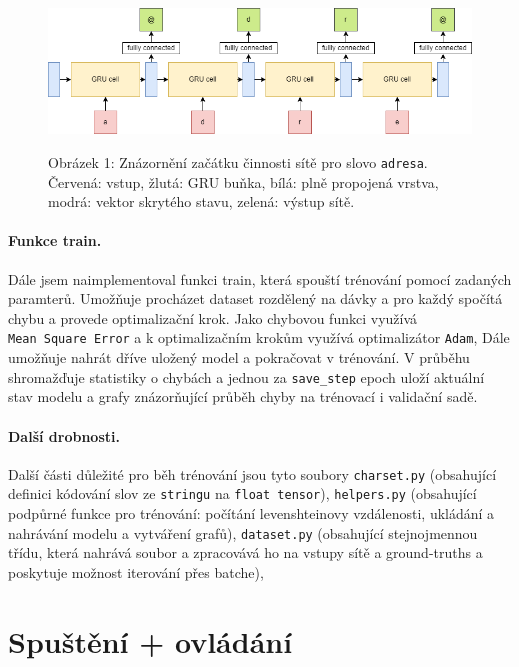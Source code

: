 \documentclass[a4paper]{article}
\theoremstyle{definition}
\begin{document}
\begin{figure}[t!]
  \centering
  \includegraphics[width=4.5in]{gru_diagram_adresa.png}\\[1pt]  %
  \caption{Obrázek 1: Znázornění začátku činnosti sítě pro slovo \texttt{adresa}.\\Červená: vstup, žlutá: GRU buňka, bílá: plně propojená vrstva, modrá: vektor skrytého stavu, zelená: výstup sítě.}
  \label{png:gru_adresa}
\end{figure}

\paragraph{Funkce train.}
Dále jsem naimplementoval funkci train, která spouští trénování pomocí zadaných paramterů. Umožňuje procházet dataset rozdělený na dávky a pro každý spočítá chybu a provede optimalizační krok. Jako chybovou funkci využívá \texttt{Mean\ Square\ Error} a k optimalizačním krokům využívá optimalizátor \texttt{Adam}, Dále umožňuje nahrát dříve uložený model a pokračovat v trénování. V průběhu shromažďuje statistiky o chybách a jednou za \texttt{save\_step} epoch uloží aktuální stav modelu a grafy znázorňující průběh chyby na trénovací i validační sadě.

\paragraph{Další drobnosti.}
Další části důležité pro běh trénování jsou tyto soubory \texttt{charset.py} (obsahující definici kódování slov ze \texttt{stringu} na \texttt{float tensor}), \texttt{helpers.py} (obsahující podpůrné funkce pro trénování: počítání levenshteinovy vzdálenosti, ukládání a nahrávání modelu a vytváření grafů), \texttt{dataset.py} (obsahující stejnojmennou třídu, která nahrává soubor a zpracovává ho na vstupy sítě a ground-truths a poskytuje možnost iterování přes batche),


\section{Spuštění + ovládání}
\end{document}
